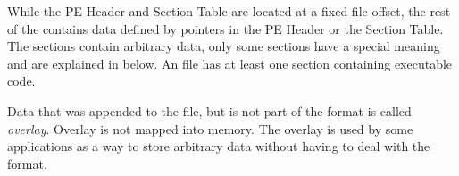 





While the PE Header and Section Table are located at a fixed file offset, the rest of the \PE{} contains data defined by pointers in the PE Header or the Section Table. The sections contain arbitrary data, only some sections have a special meaning and are explained in \emph{} below. An \EXE{} file has at least one section containing executable code.

Data that was appended to the file, but is not part of the \PE{} format is called \emph{overlay}. Overlay is not mapped into memory. The overlay is used by some applications as a way to store arbitrary data without having to deal with the \PE{} format. 

